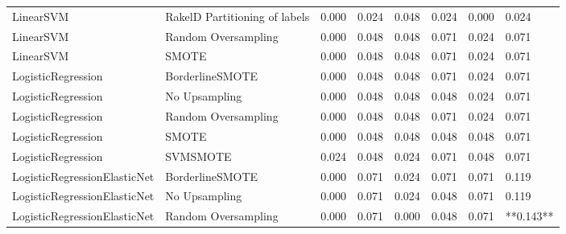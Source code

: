 \begin{tabular}{llllllll}
                      LinearSVM & RakelD Partitioning of labels & 0.000 &                     0.024 &                 0.048 &                  0.024 &                                   0.000 &     0.024 \\
                      LinearSVM &           Random Oversampling & 0.000 &                     0.048 &                 0.048 &                  0.071 &                                   0.024 &     0.071 \\
                      LinearSVM &                         SMOTE & 0.000 &                     0.048 &                 0.048 &                  0.071 &                                   0.024 &     0.071 \\
             LogisticRegression &               BorderlineSMOTE & 0.000 &                     0.048 &                 0.048 &                  0.071 &                                   0.024 &     0.071 \\
             LogisticRegression &                 No Upsampling & 0.000 &                     0.048 &                 0.048 &                  0.048 &                                   0.024 &     0.071 \\
             LogisticRegression &           Random Oversampling & 0.000 &                     0.048 &                 0.048 &                  0.071 &                                   0.024 &     0.071 \\
             LogisticRegression &                         SMOTE & 0.000 &                     0.048 &                 0.048 &                  0.048 &                                   0.048 &     0.071 \\
             LogisticRegression &                      SVMSMOTE & 0.024 &                     0.048 &                 0.024 &                  0.071 &                                   0.048 &     0.071 \\
   LogisticRegressionElasticNet &               BorderlineSMOTE & 0.000 &                     0.071 &                 0.024 &                  0.071 &                                   0.071 &     0.119 \\
   LogisticRegressionElasticNet &                 No Upsampling & 0.000 &                     0.071 &                 0.024 &                  0.048 &                                   0.071 &     0.119 \\
   LogisticRegressionElasticNet &           Random Oversampling & 0.000 &                     0.071 &                 0.000 &                  0.048 &                                   0.071 & **0.143** \\

\end{tabular}
